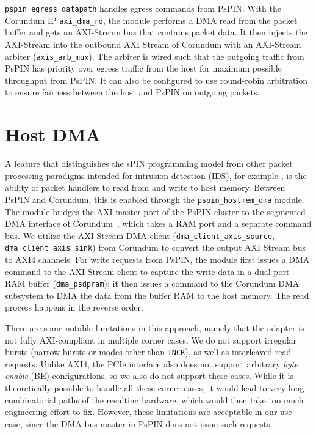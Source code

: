 \texttt{pspin\_\-egress\_\-datapath} handles egress commands from PsPIN.  With the Corundum IP \texttt{axi\_\-dma\_\-rd}, the module performs a DMA read from the packet buffer and gets an AXI-Stream bus that contains packet data.  It then injects the AXI-Stream into the outbound AXI Stream of Corundum with an AXI-Stream arbiter (\texttt{axis\_arb\_mux}).  The arbiter is wired such that the outgoing traffic from PsPIN has priority over egress traffic from the host for maximum possible throughput from PsPIN.  It can also be configured to use round-robin arbitration to ensure fairness between the host and PsPIN on outgoing packets.


\section{Host DMA}

A feature that distinguishes the sPIN programming model from other packet processing paradigms intended for intrusion detection (IDS), for example \cite{khazraee_rosebud_2023}, is the ability of packet handlers to read from and write to host memory.  Between PsPIN and Corundum, this is enabled through the \texttt{pspin\_hostmem\_dma} module.  The module bridges the AXI master port of the PsPIN cluster to the segmented DMA interface of Corundum~\cite{forencich_verilog_2023}, which takes a RAM port and a separate command bus.  We utilize the AXI-Stream DMA client (\texttt{dma\_\-client\_\-axis\_\-source}, \texttt{dma\_\-client\_\-axis\_\-sink}) from Corundum to convert the output AXI Stream bus to AXI4 channels.  For write requests from PsPIN, the module first issues a DMA command to the AXI-Stream client to capture the write data in a dual-port RAM buffer (\texttt{dma\_\-psdpram}); it then issues a command to the Corundum DMA subsystem to DMA the data from the buffer RAM to the host memory.  The read process happens in the reverse order.

There are some notable limitations in this approach, namely that the adapter is not fully AXI-compliant in multiple corner cases.  We do not support irregular bursts (narrow bursts or modes other than \texttt{INCR}), as well as interleaved read requests.  Unlike AXI4, the PCIe interface also does not support arbitrary \emph{byte enable} (BE) configurations, so we also do not support these cases.  While it is theoretically possible to handle all these corner cases, it would lead to very long combinatorial paths of the resulting hardware, which would then take too much engineering effort to fix.  However, these limitations are acceptable in our use case, since the DMA bus master in PsPIN does not issue such requests.

